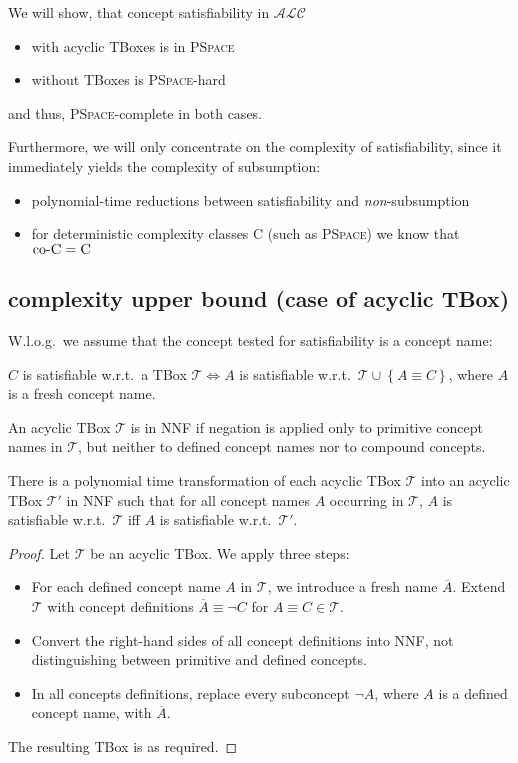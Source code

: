 We will show, that concept satisfiability in $\mathcal{ALC}$
\begin{itemize}
	\item with acyclic TBoxes is in \textsc{PSpace}
	\item without TBoxes is \textsc{PSpace}-hard
\end{itemize}
and thus, \textsc{PSpace}-complete in both cases.

Furthermore, we will only concentrate on the complexity of satisfiability,
since it immediately yields the complexity of subsumption:
\begin{itemize}
	\item polynomial-time reductions between satisfiability and \textit{non}-subsumption
	\item for deterministic complexity classes \textsc{C} (such as \textsc{PSpace})
		we know that $ \text{co-\textsc{C}} = \textsc{C}$
\end{itemize}

\subsection{complexity upper bound (case of acyclic TBox)}
W.l.o.g.\ we assume that the concept tested for satisfiability is a concept name:

$C$ is satisfiable w.r.t.\ a TBox $\mathcal{T} \iff A$ is satisfiable w.r.t.\ $\mathcal{T} \cup \left\{ A \equiv C \right\}$,
where $A$ is a fresh concept name.

An acyclic TBox $\mathcal{T}$ is in NNF if negation is applied only to primitive concept names in $\mathcal{T}$,
but neither to defined concept names nor to compound concepts.

\begin{prop}[NNF]\label{prop:5.1}
	There is a polynomial time transformation of each acyclic TBox $\mathcal{T}$
	into an acyclic TBox $\mathcal{T}'$ in NNF such that  for all concept names $A$ occurring in $\mathcal{T}$,
	$A$ is satisfiable w.r.t.\ $\mathcal{T}$ iff $A$ is satisfiable w.r.t.\ $\mathcal{T}'$.
\end{prop}
\begin{proof}
	Let $\mathcal{T}$ be an acyclic TBox.
	We apply three steps:
	\begin{itemize}
		\item For each defined concept name $A$ in $\mathcal{T}$, we introduce a fresh name $\overline{A}$.
			Extend $\mathcal{T}$ with concept definitions $\overline{A} \equiv \neg C$ for $A \equiv C \in \mathcal{T}$.
		\item Convert the right-hand sides of all concept definitions into NNF,
			not distinguishing between primitive and defined concepts.
		\item In all concepts definitions, replace every subconcept $\neg A$,
			where $A$ is a defined concept name, with $\overline{A}$.
	\end{itemize}
	The resulting TBox is as required.
\end{proof}

